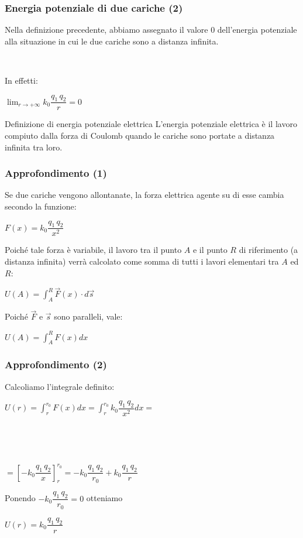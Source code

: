 \documentclass[]{beamer}
\theoremstyle{plain}
\begin{document}
\begin{frame}
\frametitle{Energia potenziale di due cariche (2)}
Nella definizione precedente, abbiamo assegnato il valore $ 0 $ dell'energia potenziale alla situazione in cui le due cariche sono a distanza infinita.
\pause

~

In effetti:
\begin{center}
$ \displaystyle \lim_{r \to + \infty} k_0 \dfrac{q_1 \, q_2}{r} = 0 $
\end{center}\pause

\begin{block}{Definizione di energia potenziale elettrica}
L'energia potenziale elettrica è il lavoro compiuto dalla forza di Coulomb quando le cariche sono portate a distanza infinita tra loro.
\end{block}
\end{frame}


\begin{frame}
\frametitle{Approfondimento (1)}
Se due cariche vengono allontanate, la forza elettrica agente su di esse cambia secondo la funzione:
\begin{center}
$ F(x) = k_0 \dfrac{q_1 \, q_2}{x^2} $
\end{center}\pause
Poiché tale forza è variabile, il lavoro tra il punto $ A $ e il punto $ R $ di riferimento (a distanza infinita) verrà calcolato come somma di tutti i lavori elementari tra $ A $ ed $ R $:
\begin{center}
$ U(A) = \displaystyle \int_A^R \vec{F}(x) \cdot d \vec{s}  $ 
\end{center}\pause
Poiché $ \vec{F} $ e $ \vec{s} $ sono paralleli, vale:
\begin{center}
$ U(A) = \displaystyle \int_A^R F(x) d x  $ 
\end{center}
\end{frame}



\begin{frame}
\frametitle{Approfondimento (2)}
Calcoliamo l'integrale definito:
\begin{center}
$ U(r) = \displaystyle \int_r^{r_0} F(x) dx = \int_r^{r_0} k_0 \dfrac{q_1 \, q_2}{x^2} dx =  $ \pause

~

~

$  = \left[ - k_0 \dfrac{q_1 \, q_2}{x} \right]^{r_0}_r =  - k_0 \dfrac{q_1 \, q_2}{r_0} + k_0 \dfrac{q_1 \, q_2}{r}  $
\end{center}\pause
Ponendo $ - k_0 \dfrac{q_1 \, q_2}{r_0} = 0 $ otteniamo
\begin{center}
$ U(r) = \displaystyle  k_0 \dfrac{q_1 \, q_2}{r} $ 
\end{center}
\end{frame}
\end{document}
